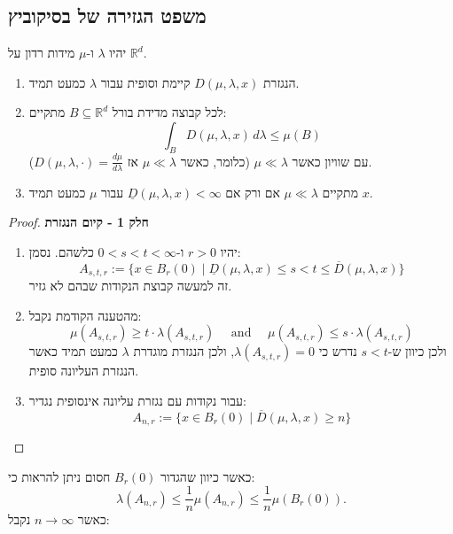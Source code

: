 \documentclass{tstextbook}
\begin{document}
\subsection{משפט הגזירה של בסיקוביץ}

\begin{theorem}
יהיו \(\lambda\) ו-\(\mu\) מידות רדון על \(\mathbb{R}^d\).

  \begin{enumerate}
    \item הנגזרת \(D(\mu, \lambda, x)\) קיימת וסופית עבור \(\lambda\) כמעט תמיד. 


    \item לכל קבוצה מדידת בורל \(B \subseteq \mathbb{R}^d\) מתקיים: 
$$ \int_B D(\mu, \lambda, x) \, d\lambda \leq \mu(B) $$
עם שוויון כאשר \(\mu \ll \lambda\) (כלומר, כאשר \(\mu \ll \lambda\) אז \(D(\mu, \lambda, \cdot) = \frac{d\mu}{d\lambda}\)).


    \item מתקיים \(\mu \ll \lambda\) אם ורק אם \(\underline{D}(\mu, \lambda, x) < \infty\) עבור \(\mu\) כמעט תמיד \(x\). 


  \end{enumerate}
\end{theorem}
\begin{proof}
\textbf{חלק 1 - קיום הנגזרת}

  \begin{enumerate}
    \item יהיו \(r > 0\) ו-\(0 < s < t < \infty\) כלשהם. נסמן: 
$$ A_{s,t,r} := \{x \in B_r(0) \mid \underline{D}(\mu, \lambda, x) \leq s < t \leq \overline{D}(\mu, \lambda, x)\} $$
זה למעשה קבוצת הנקודות שבהם לא גזיר.


    \item מהטענה הקודמת נקבל: 
$$ \mu(A_{s,t,r}) \geq t \cdot \lambda(A_{s,t,r}) \quad \text{ and }\quad  \mu(A_{s,t,r}) \leq s \cdot \lambda(A_{s,t,r}) $$
ולכן כיוון ש-\(s< t\) נדרש כי \(\lambda(A_{s,t,r})=0\), ולכן הנגזרת מוגדרת \(\lambda\) כמעט תמיד כאשר הנגזרת העליונה סופית.


    \item עבור נקודות עם נגזרת עליונה אינסופית נגדיר: 
$$ A_{n,r} := \{x \in B_r(0) \mid \overline{D}(\mu, \lambda, x) \geq n\} $$


  \end{enumerate}
\end{proof}
כאשר כיוון שהגדור \(B_{r}(0)\) חסום ניתן להראות כי:
$$\lambda(A_{n,r})\leq\frac{1}{n}\mu(A_{n,r})\leq\frac{1}{n}\mu(B_{r}(0)).$$
כאשר \(n\to \infty\) נקבל:
\end{document}

